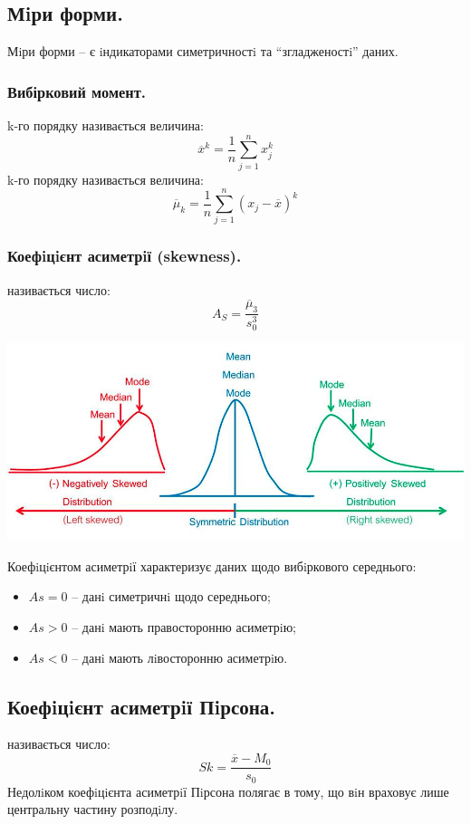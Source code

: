 \subsection{Мiри форми.}
Мiри форми – є iндикаторами симетричностi та ``згладженостi'' даних.
\subsubsection{Вибірковий момент.}
 k-го порядку називається величина:
$$
\overline{x}^k = \frac{1}{n}  \sum\limits_{j = 1}^{n}{x_j^k}
$$
 k-го порядку називається величина:
$$
\overline{\mu}_k = \frac{1}{n}  \sum\limits_{j = 1}^{n}{(x_j - \overline{x})^k}
$$

\subsubsection{Коефiцiєнт асиметрiї (skewness).}
 називається число:
$$
A_S = \frac{\overline{\mu}_3}{s_0^3}
$$
\begin{center}
 \includegraphics[scale=0.45]{assets/lectures_part_5-ad0b36c5.png}
\end{center}
Коефiцiєнтом асиметрiї характеризує  даних щодо вибiркового середнього:
\begin{itemize}
\item $As = 0$ -- данi симетричнi щодо середнього;
\item $As > 0$ -- данi мають правосторонню асиметрiю;
\item $As < 0$ -- данi мають лiвосторонню асиметрiю.
\end{itemize}
\subsection{Коефiцiєнт асиметрiї Пiрсона.}
 називається число:
$$
Sk = \frac{\overline{x} - M_0}{s_0}
$$
Недолiком коефiцiєнта асиметрiї Пiрсона полягає в тому, що вiн враховує лише центральну
частину розподiлу.
